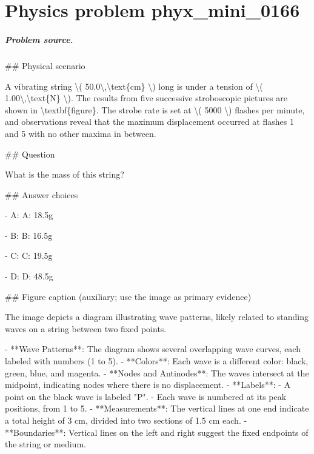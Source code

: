 
\chapter{Physics problem phyx\_mini\_0166}
\label{ch:PhyXMiniProblems_problem_phyx_mini_0166}

\paragraph{Problem source.}
\#\# Physical scenario

A vibrating string \textbackslash{}( 50.0\textbackslash{},\textbackslash{}text\{cm\} \textbackslash{}) long is under a tension of \textbackslash{}( 1.00\textbackslash{},\textbackslash{}text\{N\} \textbackslash{}). The results from five successive stroboscopic pictures are shown in \textbackslash{}textbf\{figure\}. The strobe rate is set at \textbackslash{}( 5000 \textbackslash{}) flashes per minute, and observations reveal that the maximum displacement occurred at flashes 1 and 5 with no other maxima in between.

\#\# Question

What is the mass of this string?

\#\# Answer choices

- A: A: 18.5g

- B: B: 16.5g

- C: C: 19.5g

- D: D: 48.5g

\#\# Figure caption (auxiliary; use the image as primary evidence)

The image depicts a diagram illustrating wave patterns, likely related to standing waves on a string between two fixed points.

- **Wave Patterns**: The diagram shows several overlapping wave curves, each labeled with numbers (1 to 5). 
- **Colors**: Each wave is a different color: black, green, blue, and magenta.
- **Nodes and Antinodes**: The waves intersect at the midpoint, indicating nodes where there is no displacement.
- **Labels**:
  - A point on the black wave is labeled "P".
  - Each wave is numbered at its peak positions, from 1 to 5.
- **Measurements**: The vertical lines at one end indicate a total height of 3 cm, divided into two sections of 1.5 cm each.
- **Boundaries**: Vertical lines on the left and right suggest the fixed endpoints of the string or medium.

